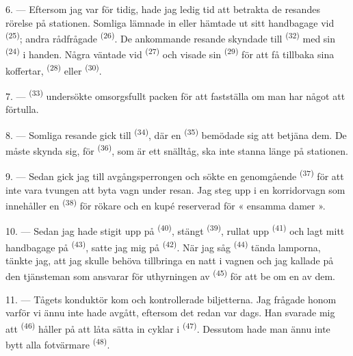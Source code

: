 6. --- Eftersom jag var för tidig, hade jag ledig tid att betrakta de resandes rörelse på
stationen. Somliga lämnade in eller hämtade ut sitt handbagage vid
 \textsuperscript{(25)}; andra rådfrågade
 \textsuperscript{(26)}. De ankommande resande skyndade
till  \textsuperscript{(32)} med sin  \textsuperscript{(24)}
i handen. Några väntade vid  \textsuperscript{(27)} och visade sin
 \textsuperscript{(29)} för att få tillbaka sina koffertar, 
\textsuperscript{(28)} eller
 \textsuperscript{(30)}.

7. ---  \textsuperscript{(33)} undersökte omsorgsfullt packen för
att fastställa om man har något att förtulla.

8. --- Somliga resande gick till  \textsuperscript{(34)}, där en
 \textsuperscript{(35)} bemödade sig att betjäna dem. De måste skynda sig, för
 \textsuperscript{(36)}, som är ett snälltåg, ska inte stanna länge på
stationen.

9. --- Sedan gick jag till avgångsperrongen och sökte en genomgående
 \textsuperscript{(37)} för att inte vara tvungen att byta vagn
under resan. Jag steg upp i en korridorvagn som innehåller en 
\textsuperscript{(38)} för rökare och en kupé reserverad för « ensamma damer ».

\VUsaut{3.0mm}

10. --- Sedan jag hade stigit upp på  \textsuperscript{(40)}, stängt
 \textsuperscript{(39)}, rullat upp  \textsuperscript{(41)}
och lagt mitt handbagage på  \textsuperscript{(43)}, satte jag mig på
 \textsuperscript{(42)}. När jag såg 
\textsuperscript{(44)} tända lamporna, tänkte jag, att jag skulle behöva tillbringa en natt i
vagnen och jag kallade på den tjänsteman som ansvarar för uthyrningen av 
\textsuperscript{(45)} för att be om en av dem.

11. --- Tågets konduktör kom och kontrollerade biljetterna. Jag frågade honom varför vi ännu
inte hade avgått, eftersom det redan var dags. Han svarade mig att
 \textsuperscript{(46)} håller på att låta sätta in cyklar i
 \textsuperscript{(47)}. Dessutom hade man ännu inte bytt
alla fotvärmare \textsuperscript{(48)}.

